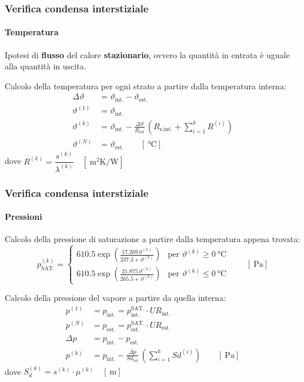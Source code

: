 \documentclass[aspectratio=141,10pt]{beamer}
\newcommand{\bc}[1]{\textcolor{pantone186}{\textbf{#1}}} %
\begin{document}
\begin{frame}
    \frametitle{Verifica condensa interstiziale}
    \framesubtitle{Temperatura}

Ipotesi di \bc{flusso} del calore \bc{stazionario}, ovvero la quantità in entrata è uguale alla quantità in uscita.    
\pause
\vspace{1cm}

Calcolo della temperatura per ogni strato a partire dalla temperatura interna:
    \begin{align*}
        \Delta\vartheta &= \vartheta_{\text{int.}} - \vartheta_{\text{est.}} \\
        \vartheta^{(1)} &= \vartheta_{\text{int.}} \\
        \vartheta^{(k)} &= \vartheta_{\text{int.}} - \frac{\Delta\vartheta}{R_{tot}} \, \left(R_{\text{s,int.}} + \sum_{i=1}^{k}R^{(i)}\right) \\
        \vartheta^{(N)} &= \vartheta_{\text{est.}} \qquad \left[\SI{}{\celsius}\right]
    \end{align*}
    dove $R^{(k)}=\dfrac{s^{(k)}}{\lambda^{(k)}} \quad [\SI{}{\metre\squared\kelvin\per\watt}]$
\end{frame}
\begin{frame}
    \frametitle{Verifica condensa interstiziale}
    \framesubtitle{Pressioni}
Calcolo della pressione di saturazione a partire dalla temperatura appena trovata:    
    \begin{equation*}
        p^{(k)}_{\text{SAT.}} =
        \begin{cases}
                610.5\exp\left(\frac{17.269\,\vartheta^{(k)}}{237.3 + \vartheta^{(k)}}\right) & \text{per $\vartheta^{(k)}\geq \SI{0}{\celsius}$}\\ 
                610.5\exp\left(\frac{21.875\,\vartheta^{(k)}}{265.5 + \vartheta^{(k)}}\right) & \text{per $\vartheta^{(k)} \leq  \SI{0}{\celsius}$}
        \end{cases}
        \qquad \left[\SI{}{\pascal}\right]
    \end{equation*}

Calcolo della pressione del vapore a partire da quella interna: 
    \begin{align*}
        p^{(1)} &= p_{\text{int.}} = p^{\text{SAT.}}_{\text{int.}} \cdot UR_{\text{int.}}\\
        p^{(N)} &= p_{\text{est.}} = p^{\text{SAT.}}_{\text{est.}} \cdot UR_{\text{est.}}\\
        \Delta p &= p_{\text{int.}} - p_{\text{est.}} \\
        p^{(k)} &= p_{\text{int.}} - \frac{\Delta p}{Sd_{tot}} \, \left(\sum_{i=1}^{k} Sd^{(i)} \right) \qquad \left[\SI{}{\pascal}\right]
    \end{align*}
    dove $S_d^{(k)} = s^{(k)} \cdot \mu^{(k)} \quad [\SI{}{\metre}]$
\end{frame}
\end{document}
